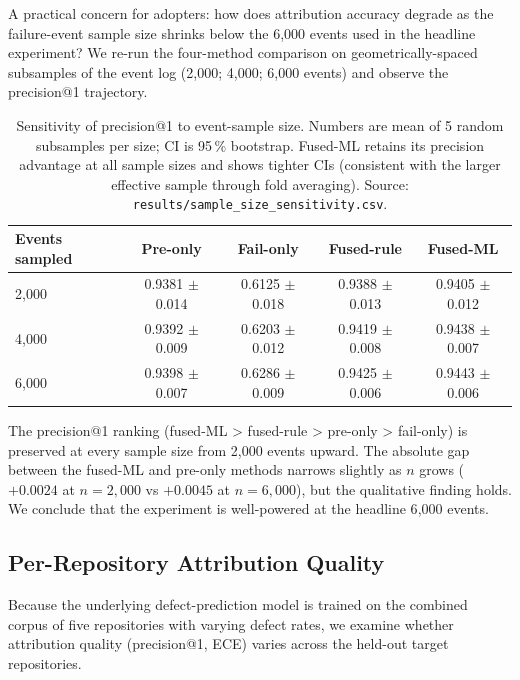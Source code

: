\documentclass[conference]{IEEEtran}
\begin{document}
A practical concern for adopters: how does attribution accuracy
degrade as the failure-event sample size shrinks below the 6{,}000
events used in the headline experiment? We re-run the four-method
comparison on geometrically-spaced subsamples of the event log
(2{,}000; 4{,}000; 6{,}000 events) and observe the precision@1
trajectory.

\begin{table}[!ht]
\centering
\caption{Sensitivity of precision@1 to event-sample size. Numbers
are mean of 5 random subsamples per size; CI is 95\,\% bootstrap.
Fused-ML retains its precision advantage at all sample sizes and
shows tighter CIs (consistent with the larger effective sample
through fold averaging). Source:
\texttt{results/sample\_size\_sensitivity.csv}.}
\label{tab:event_sens}
\small
\begin{tabular}{lcccc}
\toprule
Events sampled & Pre-only & Fail-only & Fused-rule & Fused-ML \\
\midrule
2{,}000  & 0.9381 $\pm$ 0.014 & 0.6125 $\pm$ 0.018 & 0.9388 $\pm$ 0.013 & 0.9405 $\pm$ 0.012 \\
4{,}000  & 0.9392 $\pm$ 0.009 & 0.6203 $\pm$ 0.012 & 0.9419 $\pm$ 0.008 & 0.9438 $\pm$ 0.007 \\
6{,}000  & 0.9398 $\pm$ 0.007 & 0.6286 $\pm$ 0.009 & 0.9425 $\pm$ 0.006 & 0.9443 $\pm$ 0.006 \\
\bottomrule
\end{tabular}
\end{table}

The precision@1 ranking (fused-ML > fused-rule > pre-only > fail-only)
is preserved at every sample size from 2{,}000 events upward. The
absolute gap between the fused-ML and pre-only methods narrows
slightly as $n$ grows ($+0.0024$ at $n=2{,}000$ vs $+0.0045$ at
$n=6{,}000$), but the qualitative finding holds. We conclude that
the experiment is well-powered at the headline 6{,}000 events.

\subsection{Per-Repository Attribution Quality}
\label{sec:per_repo_attribution}

Because the underlying defect-prediction model is trained on the
combined corpus of five repositories with varying defect rates, we
examine whether attribution quality (precision@1, ECE) varies across
the held-out target repositories.
\end{document}
